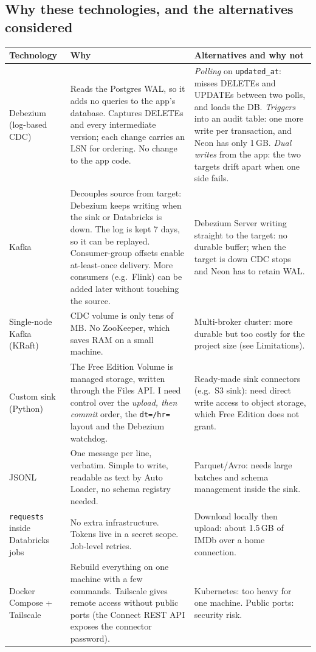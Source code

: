 \documentclass[12pt,a4paper]{article}
\newcommand{\code}[1]{\texttt{#1}}
\begin{document}
\subsection{Why these technologies, and the alternatives considered}
\begin{longtable}{@{}p{}p{}p{}@{}}
\toprule
Technology & Why & Alternatives and why not \\
\midrule
\endhead
Debezium (log-based CDC) &
Reads the Postgres WAL, so it adds no queries to the app's database. Captures DELETEs and every intermediate version;
each change carries an LSN for ordering. No change to the app code. &
\emph{Polling} on \code{updated\_at}: misses DELETEs and UPDATEs between two polls, and loads the DB.
\emph{Triggers} into an audit table: one more write per transaction, and Neon has only 1\,GB.
\emph{Dual writes} from the app: the two targets drift apart when one side fails. \\
\addlinespace
Kafka &
Decouples source from target: Debezium keeps writing when the sink or Databricks is down. The log is kept 7 days, so
it can be replayed. Consumer-group offsets enable at-least-once delivery. More consumers (e.g.\ Flink) can be added
later without touching the source. &
Debezium Server writing straight to the target: no durable buffer; when the target is down CDC stops and Neon has to
retain WAL. \\
\addlinespace
Single-node Kafka (KRaft) &
CDC volume is only tens of MB. No ZooKeeper, which saves RAM on a small machine. &
Multi-broker cluster: more durable but too costly for the project size (see Limitations). \\
\addlinespace
Custom sink (Python) &
The Free Edition Volume is managed storage, written through the Files API. I need control over the
\emph{upload, then commit} order, the \code{dt=/hr=} layout and the Debezium watchdog. &
Ready-made sink connectors (e.g.\ S3 sink): need direct write access to object storage, which Free Edition does not
grant. \\
\addlinespace
JSONL &
One message per line, verbatim. Simple to write, readable as text by Auto Loader, no schema registry needed. &
Parquet/Avro: needs large batches and schema management inside the sink. \\
\addlinespace
\code{requests} inside Databricks jobs &
No extra infrastructure. Tokens live in a secret scope. Job-level retries. &
Download locally then upload: about 1.5\,GB of IMDb over a home connection. \\
\addlinespace
Docker Compose + Tailscale &
Rebuild everything on one machine with a few commands. Tailscale gives remote access without public ports (the
Connect REST API exposes the connector password). &
Kubernetes: too heavy for one machine. Public ports: security risk. \\
\bottomrule
\end{longtable}
\end{document}
